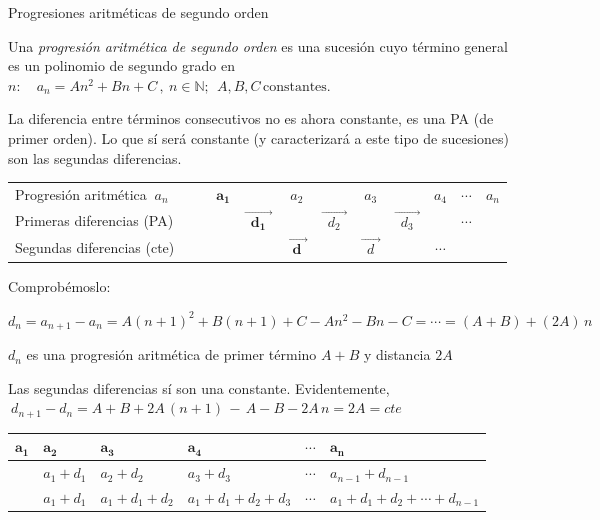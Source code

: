 \begin{myalertblock}{Progresiones aritméticas de segundo orden}

\vspace{2mm} Una \emph{progresión aritmética de segundo orden} es una sucesión cuyo término general es un polinomio de segundo grado en $n:\quad a_n=An^2+Bn+C\, , \ n\in \mathbb N;\ \ A,B,C \, \text{constantes}$.
	
\vspace{2mm} La diferencia entre términos consecutivos no es ahora constante, es una PA (de primer orden). Lo que sí será constante (y caracterizará a este tipo de sucesiones) son las segundas diferencias.

\begin{table}[H]
\centering
\small
\begin{tabular}{lcccccccccc}
Progresión aritmética $\ a_n$ & $\quad$ & $\boldsymbol{a_1}$ &  & $a_2$ &  & $a_3$ &  & $a_4$ & $\cdots$ & $a_n$ \\
Primeras diferencias (PA) & &  & $\overrightarrow{\boldsymbol{ \ \ d_1 \ \ }}$ &  & $\overrightarrow{\ \ d_2 \ \ }$ &  & $\overrightarrow{\ \ d_3\ \ }$ &  & $\cdots$ &  \\
Segundas diferencias (cte) & &  &  & $\overrightarrow{\boldsymbol{\ \ d \ \ }}$ &  & $\overrightarrow{ \ \ d \ \ }$ &  & $\cdots$ &  & 
\end{tabular}
\end{table}

\vspace{2mm} Comprobémoslo: 

\vspace{2mm} $d_n=a_{n+1}-a_n=A(n+1)^2+B(n+1)+C-An^2-Bn-C=\cdots = (A+B)+(2A)\, n$

\vspace{2mm} $d_n$ es una progresión aritmética de primer término $A+B$ y distancia $2A$
 	

\vspace{2mm} \textcolor{gris}{Las segundas diferencias sí son una constante. Evidentemente, $\ d_{n+1}-d_n=A+B+2A\, (n+1) \, - \, A-B-2A\, n =2A=cte$ \QED}

\begin{table}[H]
\centering
\begin{tabular}{l|l|l|l|l|l}
$\boldsymbol{a_1}$ & $\boldsymbol{a_2}$ & $\boldsymbol{a_3}$ & $\boldsymbol{a_4}$ & $\boldsymbol{\cdots}$ & $\boldsymbol{a_n}$ \\ \hline
 & $a_1+d_1$ & $a_2+d_2$  & $a_3+d_3$ & $\cdots$ & $a_{n-1}+d_{n-1}$ \\
 & $a_1+d_1$ & $a_1+d_1+d_2$ & $a_1+d_1+d_2+d_3$ & $\cdots$ & $a_1+d_1+d_2+\cdots + d_{n-1}$
\end{tabular}
\end{table}	


\end{myalertblock}
